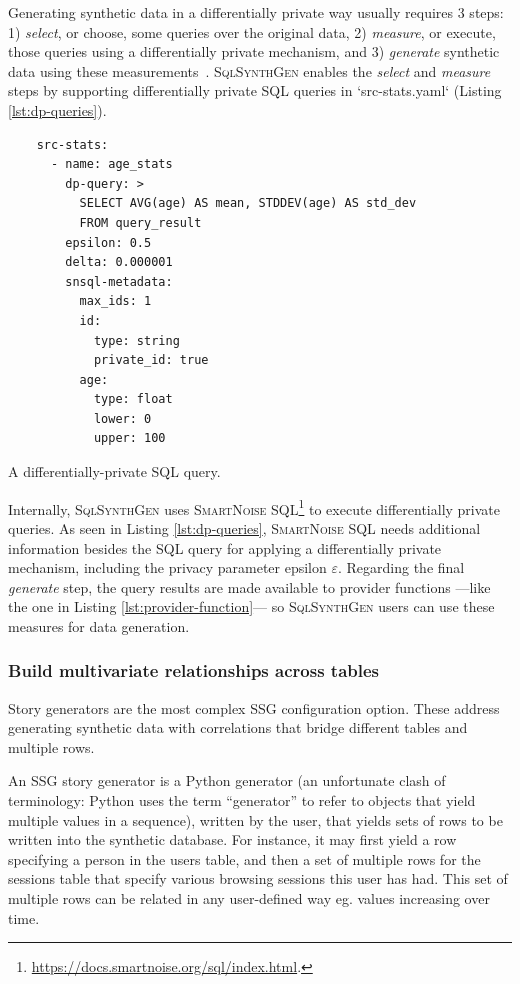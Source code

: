 \documentclass[11pt]{article}
\begin{document}
Generating synthetic data in a differentially private way usually requires 3 steps: 1) \emph{select}, or choose, some queries over the original data, 2) \emph{measure}, or execute, those queries using a differentially private mechanism, and 3) \emph{generate} synthetic data using these measurements~\cite{DBLP:journals/pvldb/McKennaMSM22}.
\textsc{SqlSynthGen} enables the \emph{select} and \emph{measure} steps by supporting differentially private SQL queries in `src-stats.yaml`  (Listing \ref{lst:dp-queries}).

\begin{listing}[H]
\begin{verbatim}
    src-stats:
      - name: age_stats
        dp-query: >
          SELECT AVG(age) AS mean, STDDEV(age) AS std_dev
          FROM query_result
        epsilon: 0.5
        delta: 0.000001
        snsql-metadata:
          max_ids: 1
          id:
            type: string
            private_id: true
          age:
            type: float
            lower: 0
            upper: 100
\end{verbatim}
\caption{A differentially-private SQL query. }
\label{lst:dp-queries}
\end{listing}

Internally, \textsc{SqlSynthGen} uses \textsc{SmartNoise SQL}\footnote{\url{https://docs.smartnoise.org/sql/index.html}.} to execute differentially private queries.
As seen in Listing \ref{lst:dp-queries}, \textsc{SmartNoise SQL} needs additional information besides the SQL query for applying a differentially private mechanism, including the privacy parameter epsilon $\varepsilon$.
Regarding the final \emph{generate} step, the query results are made available to provider functions ---like the one in Listing \ref{lst:provider-function}--- so \textsc{SqlSynthGen} users can use these measures for data generation. 


\subsubsection{Build multivariate relationships across tables}

Story generators are the most complex SSG configuration option. These address generating synthetic data with correlations that bridge different tables and multiple rows.

An SSG story generator is a Python generator (an unfortunate clash of terminology: Python uses the term “generator” to refer to objects that yield multiple values in a sequence), written by the user, that yields sets of rows to be written into the synthetic database. For instance, it may first yield a row specifying a person in the users table, and then a set of multiple rows for the sessions table that specify various browsing sessions this user has had. This set of multiple rows can be related in any user-defined way eg. values increasing over time.
\end{document}
